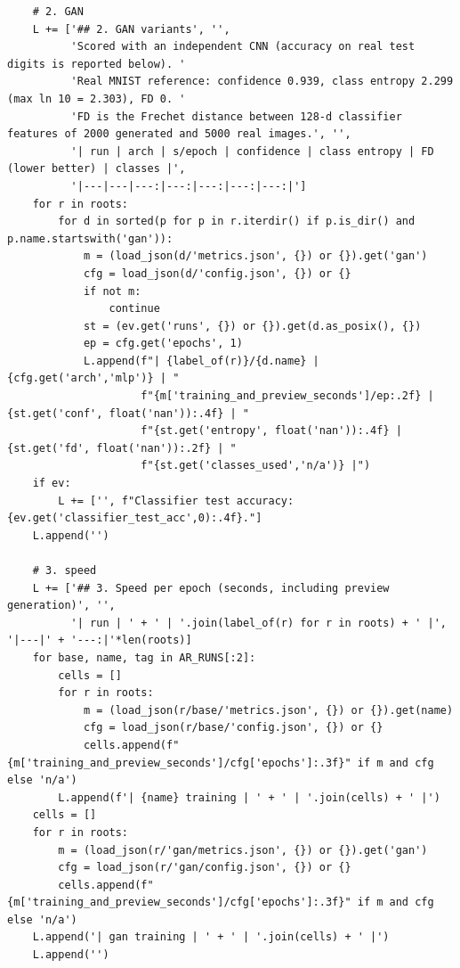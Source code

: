 \begin{lstlisting}
    # 2. GAN
    L += ['## 2. GAN variants', '',
          'Scored with an independent CNN (accuracy on real test digits is reported below). '
          'Real MNIST reference: confidence 0.939, class entropy 2.299 (max ln 10 = 2.303), FD 0. '
          'FD is the Frechet distance between 128-d classifier features of 2000 generated and 5000 real images.', '',
          '| run | arch | s/epoch | confidence | class entropy | FD (lower better) | classes |',
          '|---|---|---:|---:|---:|---:|---:|']
    for r in roots:
        for d in sorted(p for p in r.iterdir() if p.is_dir() and p.name.startswith('gan')):
            m = (load_json(d/'metrics.json', {}) or {}).get('gan')
            cfg = load_json(d/'config.json', {}) or {}
            if not m:
                continue
            st = (ev.get('runs', {}) or {}).get(d.as_posix(), {})
            ep = cfg.get('epochs', 1)
            L.append(f"| {label_of(r)}/{d.name} | {cfg.get('arch','mlp')} | "
                     f"{m['training_and_preview_seconds']/ep:.2f} | {st.get('conf', float('nan')):.4f} | "
                     f"{st.get('entropy', float('nan')):.4f} | {st.get('fd', float('nan')):.2f} | "
                     f"{st.get('classes_used','n/a')} |")
    if ev:
        L += ['', f"Classifier test accuracy: {ev.get('classifier_test_acc',0):.4f}."]
    L.append('')

    # 3. speed
    L += ['## 3. Speed per epoch (seconds, including preview generation)', '',
          '| run | ' + ' | '.join(label_of(r) for r in roots) + ' |', '|---|' + '---:|'*len(roots)]
    for base, name, tag in AR_RUNS[:2]:
        cells = []
        for r in roots:
            m = (load_json(r/base/'metrics.json', {}) or {}).get(name)
            cfg = load_json(r/base/'config.json', {}) or {}
            cells.append(f"{m['training_and_preview_seconds']/cfg['epochs']:.3f}" if m and cfg else 'n/a')
        L.append(f'| {name} training | ' + ' | '.join(cells) + ' |')
    cells = []
    for r in roots:
        m = (load_json(r/'gan/metrics.json', {}) or {}).get('gan')
        cfg = load_json(r/'gan/config.json', {}) or {}
        cells.append(f"{m['training_and_preview_seconds']/cfg['epochs']:.3f}" if m and cfg else 'n/a')
    L.append('| gan training | ' + ' | '.join(cells) + ' |')
    L.append('')


\end{lstlisting}
